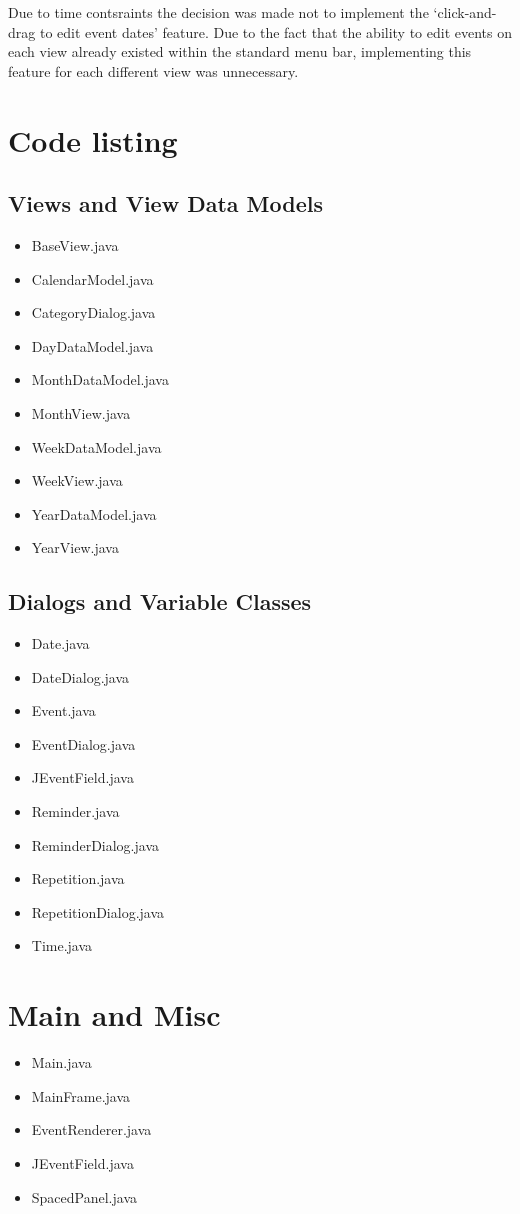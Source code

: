 \documentclass{article}
\begin{document}
Due to time contsraints the decision was made not to implement the
`click-and-drag to edit event dates' feature. Due to the fact that the
ability to edit events on each view already existed within the standard
menu bar, implementing this feature for each different view was
unnecessary.


\appendix

\section{Code listing}

\subsection{Views and View Data Models}
\begin{itemize}
\item{BaseView.java}
\item{CalendarModel.java}
\item{CategoryDialog.java}
\item{DayDataModel.java}
\item{MonthDataModel.java}
\item{MonthView.java}
\item{WeekDataModel.java}
\item{WeekView.java}
\item{YearDataModel.java}
\item{YearView.java}
\end{itemize}

\subsection{Dialogs and Variable Classes}
\begin{itemize}
\item{Date.java}
\item{DateDialog.java}
\item{Event.java}
\item{EventDialog.java}
\item{JEventField.java}
\item{Reminder.java}
\item{ReminderDialog.java}
\item{Repetition.java}
\item{RepetitionDialog.java}
\item{Time.java}
\end{itemize}

\section{Main and Misc}
\begin{itemize}
\item{Main.java}
\item{MainFrame.java}
\item{EventRenderer.java}
\item{JEventField.java}
\item{SpacedPanel.java}
\end{itemize}
\end{document}
